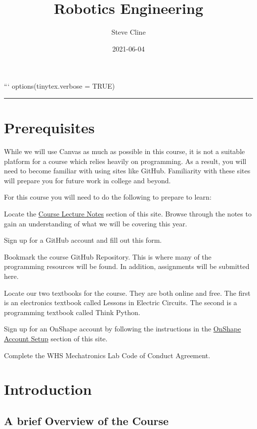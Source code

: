 \documentclass[
]{book}
\title{Robotics Engineering}
\author{Steve Cline}
\date{2021-06-04}
\begin{document}
\maketitle

{
\setcounter{tocdepth}{1}
\tableofcontents
}
```
options(tinytex.verbose = TRUE)

\begin{center}\rule{0.5\linewidth}{0.5pt}\end{center}

\hypertarget{prerequisites}{%
\chapter{Prerequisites}\label{prerequisites}}

While we will use Canvas as much as possible in this course, it is not a suitable platform for a course which relies heavily on programming. As a result, you will need to become familiar with using sites like GitHub. Familiarity with these sites will prepare you for future work in college and beyond.

For this course you will need to do the following to prepare to learn:

Locate the \protect\hyperlink{course-lecture-notes}{Course Lecture Notes} section of this site. Browse through the notes to gain an understanding of what we will be covering this year.

Sign up for a GitHub account and fill out this form.

Bookmark the course GitHub Repository. This is where many of the programming resources will be found. In addition, assignments will be submitted here.

Locate our two textbooks for the course. They are both online and free. The first is an electronics textbook called Lessons in Electric Circuits. The second is a programming textbook called Think Python.

Sign up for an OnShape account by following the instructions in the \protect\hyperlink{onshape-account-setup}{OnShape Account Setup} section of this site.

Complete the WHS Mechatronics Lab Code of Conduct Agreement.

\hypertarget{intro}{%
\chapter{Introduction}\label{intro}}

\hypertarget{a-brief-overview-of-the-course}{%
\section{A brief Overview of the Course}\label{a-brief-overview-of-the-course}}
\end{document}

